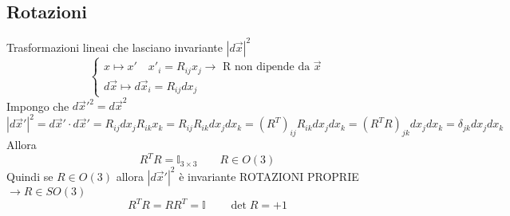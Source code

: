 \documentclass[a4paper,11pt]{report}
\theoremstyle{remark}
\theoremstyle{definition}
\begin{document}
\subsection*{Rotazioni}
Trasformazioni lineai che lasciano invariante ${|d\vec{x}|}^2$
\begin{equation*}
    \begin{cases}
        x \mapsto x' \quad x'_i = R_{ij} x_j \rightarrow \text{ R non dipende da $\vec{x}$} \\
        d\vec{x} \mapsto d\vec{x}_i = R_{ij}dx_j
    \end{cases}
\end{equation*}
Impongo che $d\vec{x}'^2 = d\vec{x}^2$
\begin{equation*}
    {|d\vec{x}'|}^2 = d\vec{x}' \cdot d\vec{x}' = R_{ij} dx_j R_{ik} x_k = R_{ij}R_{ik}dx_jdx_k = {(R^T)}_{ij}R_{ik}dx_jdx_k = {(R^TR)}_{jk}dx_jdx_k = \delta_{jk}dx_jdx_k
\end{equation*}
Allora 
\begin{equation*}
    R^TR = \mathbb{I}_{3\times3} \qquad R \in O(3)
\end{equation*}
Quindi se $R\in O(3)$ allora ${|d\vec{x}'|}^2$ è invariante \newline
ROTAZIONI PROPRIE $\rightarrow R \in SO(3)$
\begin{equation*}
    R^TR = RR^T = \mathbb{I} \qquad \det{R} = +1
\end{equation*}
\end{document}
